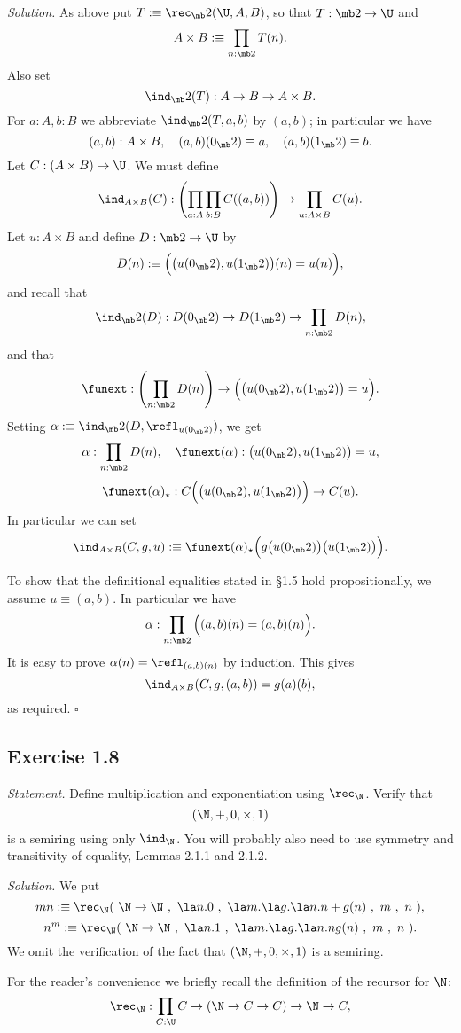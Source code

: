 \documentclass[12pt]{article}
\begin{document}
\nn\emph{Solution.} As above put $T:\equiv\rec_\mb2(\U,A,B)$, so that $T:\mb2\to\U$ and 
$$
A\times B:\equiv\prod_{n:\mb2}T(n).
$$ 
Also set
$$
\ind_\mb2(T):A\to B\to A\times B.
$$ 
For $a:A,b:B$ we abbreviate $\ind_\mb2(T,a,b)$ by $(a,b)$; in particular we have 
$$
(a,b):A\times B,\quad(a,b)(0_\mb2)\equiv a,\quad(a,b)(1_\mb2)\equiv b.
$$ 
Let $C:(A\times B)\to\U$. We must define 
$$
\ind_{A\times B}(C):\left(\prod_{a:A}\prod_{b:B}C((a,b))\right)\to\prod_{u:A\times B}C(u).
$$ 
Let $u:A\times B$ and define $D:\mb2\to\U$ by 
$$
D(n):\equiv\Big(\big(u(0_\mb2),u(1_\mb2)\big)(n)=u(n)\Big),
$$ 
and recall that 
$$
\ind_\mb2(D):D(0_\mb2)\to D(1_\mb2)\to\prod_{n:\mb2}D(n),
$$ 
and that 
$$
\funext:\left(\prod_{n:\mb2}D(n)\right)\to\Big(\big(u(0_\mb2),u(1_\mb2)\big)=u\Big).
$$ 
Setting $\alpha:\equiv\ind_\mb2(D,\refl_{u(0_\mb2)})$, we get 
$$
\alpha:\prod_{n:\mb2}D(n),\quad\funext(\alpha):\big(u(0_\mb2),u(1_\mb2)\big)=u,
$$
$$
\funext(\alpha)_\star:C\Big(\big(u(0_\mb2),u(1_\mb2)\big)\Big)\to C(u).
$$
In particular we can set
$$
\ind_{A\times B}(C,g,u):\equiv\funext(\alpha)_\star\Big(g\big(u(0_\mb2)\big)\big(u(1_\mb2)\big)\Big).
$$

To show that the definitional equalities stated in \S1.5 hold propositionally, we assume $u\equiv(a,b)$. In particular we have 
$$
\alpha:\prod_{n:\mb2}\Big((a,b)(n)=(a,b)(n)\Big).
$$ 
It is easy to prove $\alpha(n)=\refl_{(a,b)(n)}$ by induction. This gives 
$$
\ind_{A\times B}(C,g,(a,b))=g(a)(b),
$$ 
as required. $\square$


\subsection{Exercise 1.8}

\emph{Statement.} Define multiplication and exponentiation using $\rec_\N$. Verify that $$(\N,+,0,\times,1)$$ is a semiring using only $\ind_\N$. You will probably also need to use symmetry and transitivity of equality, Lemmas 2.1.1 and 2.1.2.

\nn\emph{Solution.} We put 
$$
mn:\equiv\rec_\N(\ \N\to\N\ ,\ \la n.0\ ,\ \la m.\la g.\la n.n+g(n)\ ,\ m\ ,\ n\ ),
$$
$$
n^m:\equiv\rec_\N(\ \N\to\N\ ,\ \la n.1\ ,\ \la m.\la g.\la n.ng(n)\ ,\ m\ ,\ n\ ).
$$ 
We omit the verification of the fact that $(\N,+,0,\times,1)$ is a semiring.

For the reader's convenience we briefly recall the definition of the recursor for $\N$:
$$
\rec_\N:\prod_{C:\U}C\to(\N\to C\to C)\to\N\to C,
$$
\end{document}
